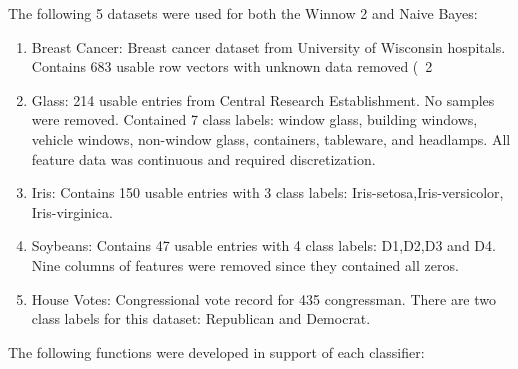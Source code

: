 \documentclass[11pt]{article}
\begin{document}
\par The following 5 datasets were used for both the Winnow 2 and Naive Bayes:

\begin{enumerate}
\item Breast Cancer: Breast cancer dataset from University of Wisconsin hospitals. Contains 683 usable row vectors with unknown data removed (~2%
\item Glass: 214 usable entries from Central Research Establishment. No samples were removed. Contained 7 class labels: window glass, building windows, vehicle windows, non-window glass, containers, tableware, and headlamps. All feature data was continuous and required discretization.

\item Iris: Contains 150 usable entries with 3 class labels: Iris-setosa,Iris-versicolor, Iris-virginica.
\item Soybeans: Contains 47 usable entries with 4 class labels: D1,D2,D3 and D4. Nine columns of features were removed since they contained all zeros.
\item House Votes: Congressional vote record for 435 congressman. There are two class labels for this dataset: Republican and Democrat.

\end{enumerate}

The following functions were developed in support of each classifier:
\end{document}
